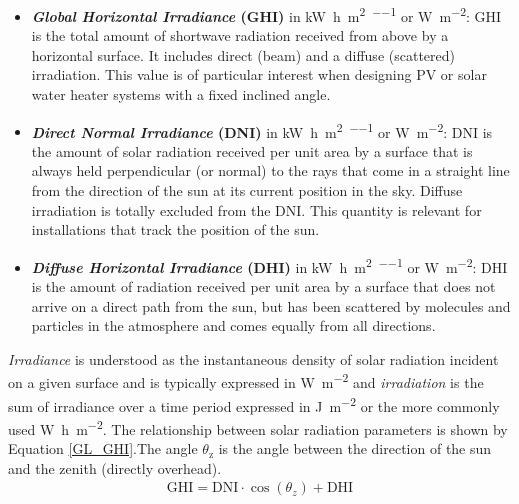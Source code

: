 \begin{itemize}
\item \textbf{\emph{Global Horizontal Irradiance} (GHI)} in \si{\kilo\watt\hour\per\square\metre\per\year} or \si{\watt\per\square\metre}: GHI is the total amount of shortwave radiation received from above by a horizontal surface. It includes direct (beam) and a diffuse (scattered) irradiation. This value is of particular interest when designing PV or solar water heater systems with a fixed inclined angle.
\item \textbf{\emph{Direct Normal Irradiance} (DNI)} in \si{\kilo\watt\hour\per\square\metre\per\year} or \si{\watt\per\square\metre}: DNI is the amount of solar radiation received per unit area by a surface that is always held perpendicular (or normal) to the rays that come in a straight line from the direction of the sun at its current position in the sky. Diffuse irradiation is totally excluded from the DNI. This quantity is relevant for installations that track the position of the sun.
\item \textbf{\emph{Diffuse Horizontal Irradiance} (DHI)} in \si{\kilo\watt\hour\per\square\metre\per\year} or \si{\watt\per\square\metre}: DHI is the amount of radiation received per unit area by a surface that does not arrive on a direct path from the sun, but has been scattered by molecules and particles in the atmosphere and comes equally from all directions.
\end{itemize}
\emph{Irradiance} is understood as the instantaneous density of solar radiation incident on a given surface and is typically expressed in \si{\watt\per\square\metre} and \emph{irradiation} is the sum of irradiance over a time period expressed in \si{\joule\per\square\metre} or the more commonly used \si{\watt\hour\per\square\metre}. The relationship between solar radiation parameters is shown by Equation \ref{GL_GHI}.The angle $\theta_\text{z}$ is the angle between the direction of the sun and the zenith (directly overhead).
\begin{align}
\text{GHI}=\text{DNI}\cdot\cos(\theta_{z})+\text{DHI}\label{GL_GHI}
\end{align}

